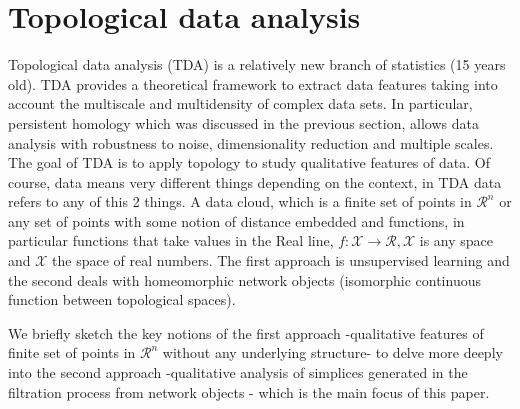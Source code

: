 \documentclass[onecollarge,runningheads]{svjour2}
\begin{document}
\section{Topological data analysis}
\label{se:tda}

Topological data analysis (TDA) is a relatively new branch of statistics (15 years old). TDA provides a theoretical framework to extract data features taking into account the multiscale and multidensity of complex data sets. In particular, persistent homology which was discussed in the previous section, allows data analysis with robustness to noise, dimensionality reduction and multiple scales. The goal of TDA is to apply topology to study qualitative features of data. Of course, data means very different things depending on the context, in TDA data refers to any of this 2 things. A data cloud, which is  a finite set of points in $\mathcal{R}^n$ or any set of points with some notion of distance embedded and functions, in particular functions that take values in the Real line, $f:\mathcal{X} \to \mathcal{R}, \mathcal{X}$ is any space and $\mathcal{X}$ the space of real numbers. The first approach is unsupervised learning and the second deals with homeomorphic network objects (isomorphic continuous function between topological spaces).

We briefly sketch the key notions of the first approach -qualitative features of finite set of points in $\mathcal{R}^n$ without any underlying structure- to delve more deeply into the second approach -qualitative analysis of simplices generated in the filtration process from network objects - which is the main focus of this paper.
\end{document}
